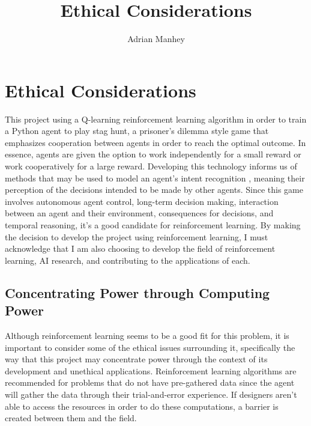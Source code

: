 \documentclass[10pt,twocolumn]{article}
\title{Ethical Considerations}
\author{Adrian Manhey}
\affiliation{Occidental College}
\begin{document}
\maketitle

\section{Ethical Considerations}

This project using a Q-learning reinforcement learning algorithm in order to train a Python agent to play stag hunt, a prisoner’s dilemma style game that emphasizes cooperation between agents in order to reach the optimal outcome. In essence, agents are given the option to work independently for a small reward or work cooperatively for a large reward. Developing this technology informs us of methods that may be used to model an agent’s intent recognition \cite{Rabkina2019}, meaning their perception of the decisions intended to be made by other agents. Since this game involves autonomous agent control, long-term decision making, interaction between an agent and their environment, consequences for decisions, and temporal reasoning, it’s a good candidate for reinforcement learning. By making the decision to develop the project using reinforcement learning, I must acknowledge that I am also choosing to develop the field of reinforcement learning, AI research, and contributing to the applications of each.

\subsection{Concentrating Power through Computing Power}

Although reinforcement learning seems to be a good fit for this problem, it is important to consider some of the ethical issues surrounding it, specifically the way that this project may concentrate power through the context of its development and unethical applications. Reinforcement learning algorithms are recommended for problems that do not have pre-gathered data since the agent will gather the data through their trial-and-error experience. If designers aren’t able to access the resources in order to do these computations, a barrier is created between them and the field.
\end{document}
